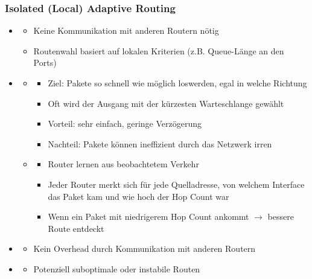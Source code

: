 \subsubsection*{Isolated (Local) Adaptive Routing}
\begin{itemize}
    \item {}
    \begin{itemize}
        \item Keine Kommunikation mit anderen Routern nötig
        \item Routenwahl basiert auf lokalen Kriterien (z.B. Queue-Länge an den Ports)
    \end{itemize}
    \item {}
    \begin{itemize}
        \item {}
        \begin{itemize}
            \item Ziel: Pakete so schnell wie möglich loswerden, egal in welche Richtung
            \item Oft wird der Ausgang mit der kürzesten Warteschlange gewählt
            \item Vorteil: sehr einfach, geringe Verzögerung
            \item Nachteil: Pakete können ineffizient durch das Netzwerk irren
        \end{itemize}
        \item {}
        \begin{itemize}
            \item Router lernen aus beobachtetem Verkehr
            \item Jeder Router merkt sich für jede Quelladresse, von welchem Interface das Paket kam und wie hoch der Hop Count war
            \item Wenn ein Paket mit niedrigerem Hop Count ankommt $\rightarrow$ bessere Route entdeckt
        \end{itemize}
    \end{itemize}
    \item {}
    \begin{itemize}
        \item Kein Overhead durch Kommunikation mit anderen Routern
    \end{itemize}
    \item {}
    \begin{itemize}
        \item Potenziell suboptimale oder instabile Routen
    \end{itemize}
\end{itemize}
